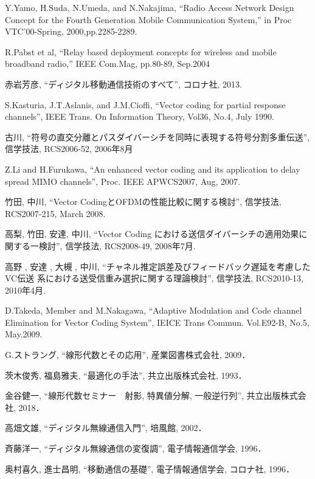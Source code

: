 \begin{thebibliography}{99}
     Y.Yamo, H.Suda, N.Umeda, and N.Nakajima,
    ``Radio Access Network Design Concept for the Fourth Generation Mobile
    Communication System,'' in Proc VTC'00-Spring, 2000,pp.2285-2289.

     R.Pabst et al, 
    “Relay based deployment concepts for wireless and mobile broadband radio,” IEEE
    Com.Mag, pp.80-89, Sep.2004

     赤岩芳彦, ``ディジタル移動通信技術のすべて'', コロナ社, 2013.

     S.Kasturia, J.T.Aslanis, and J.M.Cioffi, ``Vector coding for partial
    response channels'', IEEE Trans. On Information Theory, Vol36, No.4, July 1990.

     古川, ``符号の直交分離とパスダイバーシチを同時に表現する符号分割多重伝送'',
    信学技法, RCS2006-52, 2006年8月

     Z.Li and H.Furukawa, ``An enhanced vector coding and its application to delay
    spread MIMO channels'', Proc. IEEE APWCS2007, Aug, 2007.

     竹田, 中川, ``Vector CodingとOFDMの性能比較に関する検討'', 信学技法,
    RCS2007-215, March 2008.

     高梨, 竹田, 安達, 中川, ``Vector Coding における送信ダイバーシチの適用効果に
    関する一検討'', 信学技法, RCS2008-49, 2008年7月.

     高野 , 安達 , 大槻 , 中川, ``チャネル推定誤差及びフィードバック遅延を考慮したVC伝送
    系における送受信重み選択に関する理論検討'', 信学技法, RCS2010-13, 2010年4月.

     D.Takeda, Member and M.Nakagawa, ``Adaptive Modulation and Code channel
    Elimination for Vector Coding System'', IEICE Trans Commun. Vol.E92-B, No.5, May.2009.

     G.ストラング, ``線形代数とその応用'', 産業図書株式会社, 2009．

     茨木俊秀, 福島雅夫, ``最適化の手法'', 共立出版株式会社, 1993．

     金谷健一, ``線形代数セミナー　射影, 特異値分解, 一般逆行列'', 共立出版株式会社, 2018．

     高畑文雄, ``ディジタル無線通信入門'', 培風館, 2002．

     斉藤洋一, ``ディジタル無線通信の変復調'', 電子情報通信学会, 1996．

     奥村喜久, 進士昌明, ``移動通信の基礎'', 電子情報通信学会, コロナ社, 1996．

\end{thebibliography}
